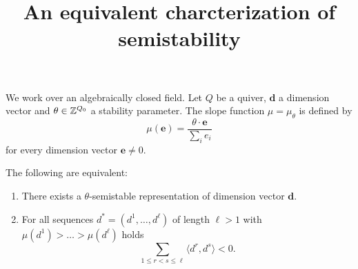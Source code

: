 \documentclass[a4paper]{article}
\title{An equivalent charcterization of semistability}
\author{}
\begin{document}
\maketitle

We work over an algebraically closed field. Let $Q$ be a quiver, $\mathbf{d}$ a dimension vector and $\theta \in \mathbb{Z}^{Q_0}$ a stability parameter. The slope function $\mu = \mu_\theta$ is defined by
\[
    \mu(\mathbf{e}) = \frac{\theta\cdot \mathbf{e}}{\sum_i e_i}    
\]
for every dimension vector $\mathbf{e} \neq 0$.

\begin{proposition}
    The following are equivalent:
    \begin{enumerate}
        \item There exists a $\theta$-semistable representation of dimension vector $\mathbf{d}$.
        \item For all sequences $d^* = (d^1,\ldots,d^\ell)$ of length $\ell > 1$ with $\mu(d^1) > \ldots > \mu(d^\ell)$ holds
        \[
            \sum_{1 \leq r < s \leq \ell} \langle d^r, d^s \rangle < 0.    
        \]
    \end{enumerate}
\end{proposition}

\end{document}
